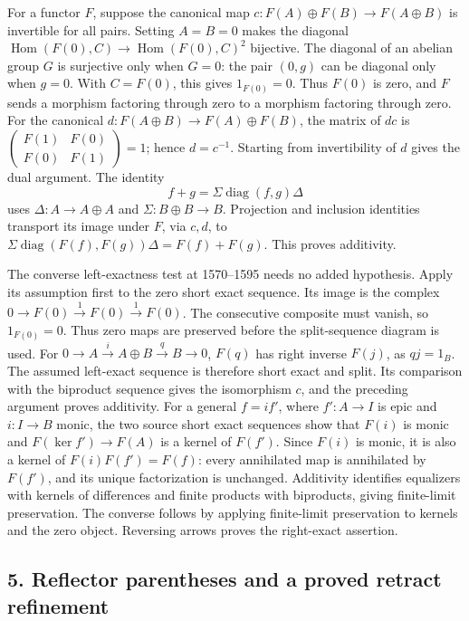 \documentclass[11pt]{article}
\begin{document}
For a functor \(F\), suppose the canonical map \(c:F(A)\oplus F(B)\to F(A\oplus B)\) is invertible for all pairs. Setting \(A=B=0\) makes the diagonal \(\operatorname{Hom}(F(0),C)\to\operatorname{Hom}(F(0),C)^2\) bijective. The diagonal of an abelian group \(G\) is surjective only when \(G=0\): the pair \((0,g)\) can be diagonal only when \(g=0\). With \(C=F(0)\), this gives \(1_{F(0)}=0\). Thus \(F(0)\) is zero, and \(F\) sends a morphism factoring through zero to a morphism factoring through zero. For the canonical \(d:F(A\oplus B)\to F(A)\oplus F(B)\), the matrix of \(dc\) is \(\left(\begin{smallmatrix}F(1)&F(0)\\F(0)&F(1)\end{smallmatrix}\right)=1\); hence \(d=c^{-1}\). Starting from invertibility of \(d\) gives the dual argument. The identity \[
f+g=\Sigma\operatorname{diag}(f,g)\Delta
\] uses \(\Delta:A\to A\oplus A\) and \(\Sigma:B\oplus B\to B\). Projection and inclusion identities transport its image under \(F\), via \(c,d\), to \(\Sigma\operatorname{diag}(F(f),F(g))\Delta=F(f)+F(g)\). This proves additivity.

The converse left-exactness test at 1570--1595 needs no added hypothesis. Apply its assumption first to the zero short exact sequence. Its image is the complex \(0\to F(0)\xrightarrow1 F(0)\xrightarrow1 F(0)\). The consecutive composite must vanish, so \(1_{F(0)}=0\). Thus zero maps are preserved before the split-sequence diagram is used. For \(0\to A\xrightarrow i A\oplus B\xrightarrow q B\to0\), \(F(q)\) has right inverse \(F(j)\), as \(qj=1_B\). The assumed left-exact sequence is therefore short exact and split. Its comparison with the biproduct sequence gives the isomorphism \(c\), and the preceding argument proves additivity. For a general \(f=i f'\), where \(f':A\to I\) is epic and \(i:I\to B\) monic, the two source short exact sequences show that \(F(i)\) is monic and \(F(\ker f')\to F(A)\) is a kernel of \(F(f')\). Since \(F(i)\) is monic, it is also a kernel of \(F(i)F(f')=F(f)\): every annihilated map is annihilated by \(F(f')\), and its unique factorization is unchanged. Additivity identifies equalizers with kernels of differences and finite products with biproducts, giving finite-limit preservation. The converse follows by applying finite-limit preservation to kernels and the zero object. Reversing arrows proves the right-exact assertion.

\subsection{5. Reflector parentheses and a proved retract refinement}\label{note-01-reflector-parentheses-and-a-proved-retract-refinement}
\end{document}
